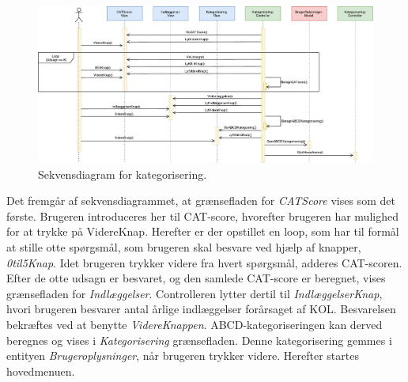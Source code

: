 \begin{figure} [H]
\centering
\includegraphics[width=1.3\textwidth, angle=90]{figures/Sek/SEKKategorisering}
\caption{Sekvensdiagram for kategorisering.}
\label{fig:SEKKategorisering}
\end{figure}

\noindent
Det fremgår af sekvensdiagrammet, at grænsefladen for \textit{CATScore} vises som det første. Brugeren introduceres her til CAT-score, hvorefter brugeren har mulighed for at trykke på VidereKnap. Herefter er der opstillet en loop, som har til formål at stille otte spørgsmål, som brugeren skal besvare ved hjælp af knapper, \textit{0til5Knap}. Idet brugeren trykker videre fra hvert spørgsmål, adderes CAT-scoren. Efter de otte udsagn er besvaret, og den samlede CAT-score er beregnet, vises grænsefladen for \textit{Indlæggelser}. Controlleren lytter dertil til \textit{IndlæggelserKnap}, hvori brugeren besvarer antal årlige indlæggelser forårsaget af KOL. Besvarelsen bekræftes ved at benytte \textit{VidereKnappen}. ABCD-kategoriseringen kan derved beregnes og vises i \textit{Kategorisering} grænsefladen. Denne kategorisering gemmes i entityen \textit{Brugeroplysninger}, når brugeren trykker videre. Herefter startes hovedmenuen.
